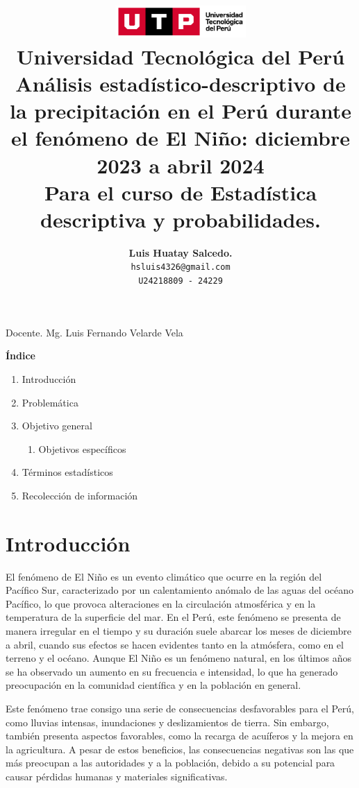 \documentclass{article}
\title{
  \includegraphics[width=5cm]{./assets/logo-utp.png} \\
  \vspace{1cm}
  \textbf{Universidad Tecnológica del Perú} \\
  \vspace{2cm}
  \textbf{Análisis estadístico-descriptivo de la precipitación en el Perú durante el fenómeno de El Niño: diciembre 2023 a abril 2024} \\
  \vspace{1cm}
  \large \textbf{Para el curso de Estadística descriptiva y probabilidades.}
}
\author{
  \textbf{Luis Huatay Salcedo.} \\
  \texttt{hsluis4326@gmail.com} \\
  \texttt{U24218809 - 24229}
}
\begin{document}
\maketitle

\begin{center}
  Docente. Mg. Luis Fernando Velarde Vela  
\end{center}
\restoregeometry

\newpage

\begin{center}
  \textbf{\Large Índice}
\end{center}
\vspace{0.5cm} %

\begin{spacing}{1.15} %
  \noindent
  \begin{enumerate}
    \item Introducción
    \item Problemática
    \item Objetivo general
    \begin{enumerate}
      \item Objetivos específicos
    \end{enumerate}
    \item Términos estadísticos
    \item Recolección de información
  \end{enumerate}
\end{spacing}

\newpage
\vspace*{\fill}
\section{Introducción}
El fenómeno de El Niño es un evento climático que ocurre en la región del Pacífico Sur, caracterizado por un calentamiento anómalo de las aguas del océano Pacífico, lo que provoca alteraciones en la circulación atmosférica y en la temperatura de la superficie del mar. En el Perú, este fenómeno se presenta de manera irregular en el tiempo y su duración suele abarcar los meses de diciembre a abril, cuando sus efectos se hacen evidentes tanto en la atmósfera, como en el terreno y el océano. Aunque El Niño es un fenómeno natural, en los últimos años se ha observado un aumento en su frecuencia e intensidad, lo que ha generado preocupación en la comunidad científica y en la población en general.

Este fenómeno trae consigo una serie de consecuencias desfavorables para el Perú, como lluvias intensas, inundaciones y deslizamientos de tierra. Sin embargo, también presenta aspectos favorables, como la recarga de acuíferos y la mejora en la agricultura. A pesar de estos beneficios, las consecuencias negativas son las que más preocupan a las autoridades y a la población, debido a su potencial para causar pérdidas humanas y materiales significativas.
\end{document}
